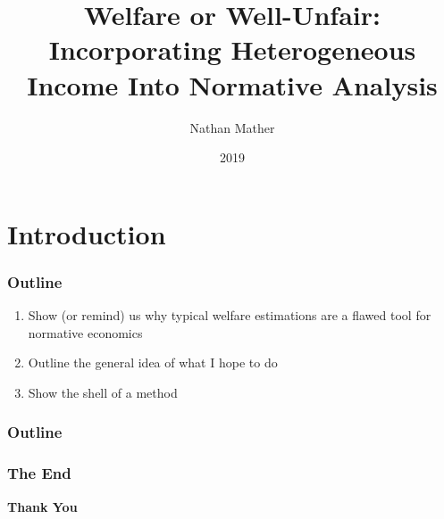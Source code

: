 \documentclass{beamer}
\title{Welfare or Well-Unfair: Incorporating Heterogeneous Income Into Normative Analysis}
\author{Nathan Mather}
\institute{University of Michigan}
\date{2019}
\begin{document}
	
	\frame{\titlepage}
	
\section{Introduction}

\begin{frame}
	\frametitle{Outline}
	\begin{enumerate}
		\setlength{\itemsep}{8mm}
		 \large
		 \item Show (or remind) us why typical welfare estimations are a flawed tool for normative economics 
		\item Outline the general idea of what I hope to do 
		\item Show the shell of a method 
	\end{enumerate}
\end{frame}


\begin{frame}
\frametitle{Outline}

\end{frame}


\begin{frame}

\frametitle{The End }

\begin{center}
	
\begin{Huge}
\textbf{Thank You}
\end{Huge}
\end{center}
\end{frame}

\end{document}
